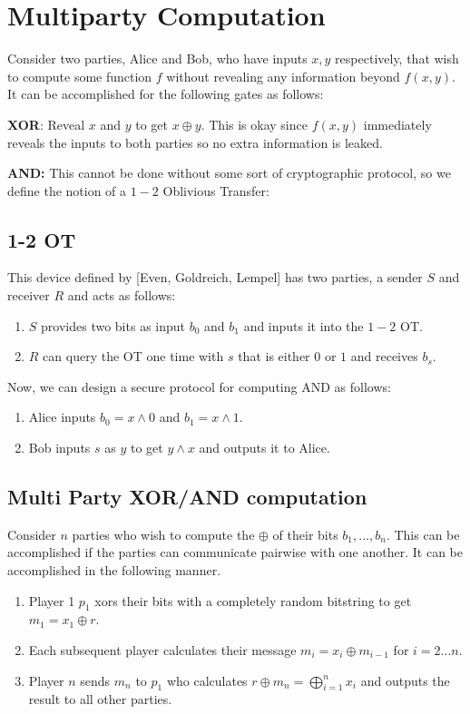 \documentclass[11pt]{article}
\begin{document}
\section{Multiparty Computation}
Consider two parties, Alice and Bob, who have inputs $x,y$ respectively, that wish to compute some function $f$ without revealing any information beyond $f(x,y)$. It can be accomplished for the following gates as follows:
\bigskip

\textbf{XOR}: Reveal $x$ and $y$ to get $x \oplus y$. This is okay since $f(x,y)$ immediately reveals the inputs to both parties so no extra information is leaked.
\bigskip

\textbf{AND:} This cannot be done without some sort of cryptographic protocol, so we define the notion of a $1-2$ Oblivious Transfer:
\subsection{1-2 OT}
This device defined by [Even, Goldreich, Lempel] has two parties, a sender $S$ and receiver $R$ and acts as follows:
\begin{enumerate}
    \item $S$ provides two bits as input $b_0$ and $b_1$ and inputs it into the $1-2$ OT.
    \item $R$ can query the OT one time with $s$ that is either $0$ or $1$ and receives $b_s$.
\end{enumerate}
Now, we can design a secure protocol for computing AND as follows:
\begin{enumerate}
    \item Alice inputs $b_0 = x \land 0$ and $b_1 = x \land 1$.
    \item Bob inputs $s$ as $y$ to get $y \land x$ and outputs it to Alice.
\end{enumerate}

\subsection{Multi Party XOR/AND computation}
Consider $n$ parties who wish to compute the $\oplus$ of their bits $b_1,..., b_n$. This can be accomplished if the parties can communicate pairwise with one another. It can be accomplished in the following manner.
\begin{enumerate}
    \item Player 1 $p_1$ xors their bits with a completely random bitstring to get $m_1 = x_1 \oplus r$.
    \item Each subsequent player calculates their message $m_i = x_{i} \oplus m_{i-1}$ for $i=2...n$.
    \item Player $n$ sends $m_n$ to $p_1$ who calculates $r \oplus m_n = \bigoplus_{i=1}^{n} x_i$ and outputs the result to all other parties.
\end{enumerate}
\end{document}
